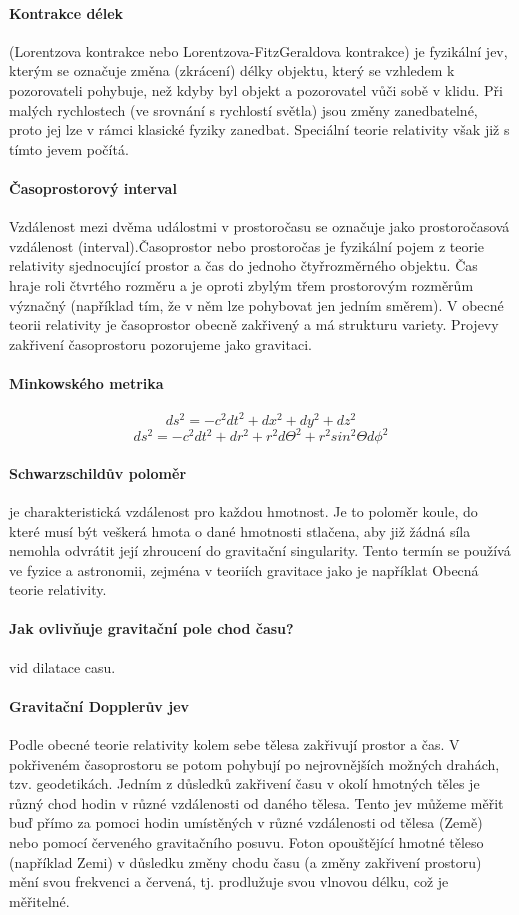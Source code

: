 \documentclass[11pt,a4paper,notitlepage,twocolumn]{article}
\begin{document}
\paragraph{Kontrakce délek} (Lorentzova kontrakce nebo Lorentzova-FitzGeraldova kontrakce) je fyzikální jev, kterým se označuje změna (zkrácení) délky objektu, který se vzhledem k pozorovateli pohybuje, než kdyby byl objekt a pozorovatel vůči sobě v klidu.
Při malých rychlostech (ve srovnání s rychlostí světla) jsou změny zanedbatelné, proto jej lze v rámci klasické fyziky zanedbat. Speciální teorie relativity však již s tímto jevem počítá.
\paragraph{Časoprostorový interval}
Vzdálenost mezi dvěma událostmi v prostoročasu se označuje jako prostoročasová vzdálenost (interval).Časoprostor nebo prostoročas je fyzikální pojem z teorie relativity sjednocující prostor a čas do jednoho čtyřrozměrného objektu. Čas hraje roli čtvrtého rozměru a je oproti zbylým třem prostorovým rozměrům význačný (například tím, že v něm lze pohybovat jen jedním směrem). V obecné teorii relativity je časoprostor obecně zakřivený a má strukturu variety. Projevy zakřivení časoprostoru pozorujeme jako gravitaci.
\paragraph{Minkowského metrika}
\[ ds^2 = −c^2 dt^2+ dx^2 + dy^2 + dz^2\] 
\[ ds^2 = −c^2 dt^2 + dr^2 + r^2 d\Theta^2 + r^2 sin^2\Theta d\phi^2 \]
\paragraph{Schwarzschildův poloměr}
je charakteristická vzdálenost pro každou hmotnost. Je to poloměr koule, do které musí být veškerá hmota o dané hmotnosti stlačena, aby již žádná síla nemohla odvrátit její zhroucení do gravitační singularity. Tento termín se používá ve fyzice a astronomii, zejména v teoriích gravitace jako je napříklat Obecná teorie relativity.

\paragraph{Jak ovlivňuje gravitační pole chod času?}
vid dilatace casu.
\paragraph{Gravitační Dopplerův jev}
Podle obecné teorie relativity kolem sebe tělesa zakřivují prostor a čas. V pokřiveném časoprostoru se potom pohybují po nejrovnějších možných drahách, tzv. geodetikách. Jedním z důsledků zakřivení času v okolí hmotných těles je různý chod hodin v různé vzdálenosti od daného tělesa. Tento jev můžeme měřit buď přímo za pomoci hodin umístěných v různé vzdálenosti od tělesa (Země) nebo pomocí červeného gravitačního posuvu. Foton opouštějící hmotné těleso (například Zemi) v důsledku změny chodu času (a změny zakřivení prostoru) mění svou frekvenci a červená, tj. prodlužuje svou vlnovou délku, což je měřitelné.
\end{document}
